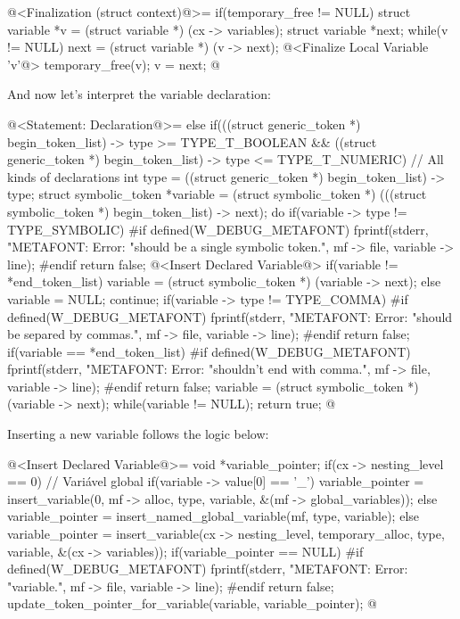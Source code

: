 \iniciocodigo
@<Finalization (struct context)@>=
if(temporary_free != NULL){
  struct variable *v = (struct variable *) (cx -> variables);
  struct variable *next;
  while(v != NULL){
    next = (struct variable *) (v -> next);
    @<Finalize Local Variable 'v'@>
    temporary_free(v);
    v = next;
  }
}
@
\fimcodigo

And now let's interpret the variable declaration:

\iniciocodigo
@<Statement: Declaration@>=
else if(((struct generic_token *) begin_token_list) -> type >=
        TYPE_T_BOOLEAN &&
        ((struct generic_token *) begin_token_list) -> type <=
        TYPE_T_NUMERIC){ // All kinds of declarations
  int type = ((struct generic_token *) begin_token_list) -> type;
  struct symbolic_token *variable = (struct symbolic_token *)
           (((struct symbolic_token *) begin_token_list) -> next);
  do{
    if(variable -> type != TYPE_SYMBOLIC){
#if defined(W_DEBUG_METAFONT)
      fprintf(stderr, "METAFONT: Error: %
                    "should be a single symbolic token.\n", mf -> file,
                    variable -> line);
#endif
      return false;
    }
    @<Insert Declared Variable@>
    if(variable != *end_token_list)
      variable = (struct symbolic_token *) (variable -> next);
    else{
      variable = NULL;
      continue;
    }
    if(variable -> type != TYPE_COMMA){
#if defined(W_DEBUG_METAFONT)
      fprintf(stderr, "METAFONT: Error: %
                    "should be separed by commas.\n", mf -> file,
                    variable -> line);
#endif
      return false;
    }
    if(variable == *end_token_list){
#if defined(W_DEBUG_METAFONT)
      fprintf(stderr, "METAFONT: Error: %
                    "shouldn't end with comma.\n", mf -> file,
                    variable -> line);
#endif
      return false;
    }
    variable = (struct symbolic_token *) (variable -> next);
  } while(variable != NULL);
  return true;
}
@
\fimcodigo

Inserting a new variable follows the logic below:

\iniciocodigo
@<Insert Declared Variable@>=
{
  void *variable_pointer;
  if(cx -> nesting_level == 0){ // Variável global
    if(variable -> value[0] == '_')
      variable_pointer = insert_variable(0, mf -> alloc, type, variable,
                                         &(mf -> global_variables));
    else
      variable_pointer = insert_named_global_variable(mf, type, variable);
  }
  else
    variable_pointer = insert_variable(cx -> nesting_level,
                                      temporary_alloc, type,
                                      variable, &(cx -> variables));
  if(variable_pointer == NULL){
#if defined(W_DEBUG_METAFONT)
      fprintf(stderr, "METAFONT: Error: %
                    "variable.\n", mf -> file, variable -> line);
#endif
    return false;
  }
  update_token_pointer_for_variable(variable, variable_pointer);
}
@
\fimcodigo

